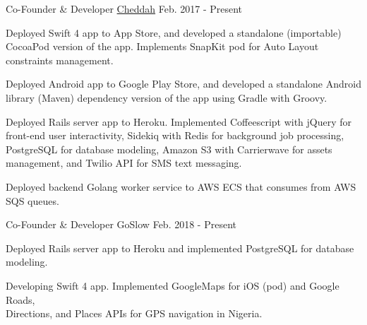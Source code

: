 \vspace{10mm}


\begin{cventries}

  \cventry
    {Co-Founder \& Developer} %
    {\href{http://cheddah.herokuapp.com/}{Cheddah}} %
    {} %
    {Feb. 2017 - Present} %
    {
      \begin{cvitems} %
        \item {Deployed Swift 4 app to App Store, and developed a standalone (importable) CocoaPod version of the app. Implements SnapKit pod for Auto Layout constraints management.}
        \item {Deployed Android app to Google Play Store, and developed a standalone Android library (Maven) dependency version of the app using Gradle with Groovy.}
        \item {Deployed Rails server app to Heroku. Implemented Coffeescript with jQuery for front-end user interactivity, Sidekiq with Redis for background job processing, PostgreSQL for database modeling, Amazon S3 with Carrierwave for assets management, and Twilio API for SMS text messaging.}
        \item {Deployed backend Golang worker service to AWS ECS that consumes from AWS SQS queues.}
      \end{cvitems}
    }

\vspace{5mm}
  \cventry
    {Co-Founder \& Developer} %
    {GoSlow} %
    {} %
    {Feb. 2018 - Present} %
    {
      \begin{cvitems} %
        \item {Deployed Rails server app to Heroku and implemented PostgreSQL for database modeling.}
        \item {Developing Swift 4 app. Implemented GoogleMaps for iOS (pod) and Google Roads, \\Directions, and Places APIs for GPS navigation in Nigeria.}
      \end{cvitems}
    }


\end{cventries}